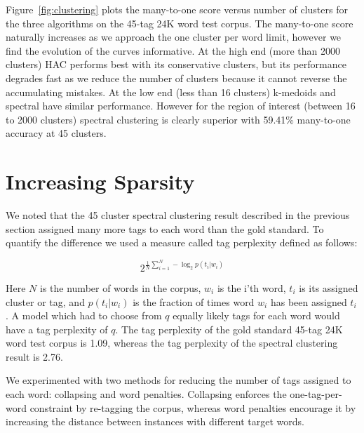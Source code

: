 \documentclass[11pt]{article}
\newcommand{\spectralResult}{59.41}
\begin{document}


Figure~\ref{fig:clustering} plots the many-to-one score versus number
of clusters for the three algorithms on the 45-tag 24K word test
corpus.  The many-to-one score naturally increases as we approach the
one cluster per word limit, however we find the evolution of the
curves informative.  At the high end (more than 2000 clusters) HAC
performs best with its conservative clusters, but its performance
degrades fast as we reduce the number of clusters because it cannot
reverse the accumulating mistakes.  At the low end (less than 16
clusters) k-medoids and spectral have similar performance.  However
for the region of interest (between 16 to 2000 clusters) spectral
clustering is clearly superior with \spectralResult\% many-to-one
accuracy at 45 clusters.

\section{Increasing Sparsity}
\label{sec:sparsity}

We noted that the 45 cluster spectral clustering result described in
the previous section assigned many more tags to each word than the
gold standard.  To quantify the difference we used a measure called
tag perplexity defined as follows:

\[ 2^{\frac{1}{N}\sum_{i=1}^N -\log_2 p(t_i | w_i)} \]

Here $N$ is the number of words in the corpus, $w_i$ is the i'th word,
$t_i$ is its assigned cluster or tag, and $p(t_i|w_i)$ is the fraction
of times word $w_i$ has been assigned $t_i$.  A model which had to
choose from $q$ equally likely tags for each word would have a tag
perplexity of $q$.  The tag perplexity of the gold standard 45-tag 24K
word test corpus is 1.09, whereas the tag perplexity of the spectral
clustering result is 2.76.

We experimented with two methods for reducing the number of tags
assigned to each word: collapsing and word penalties.  Collapsing
enforces the one-tag-per-word constraint by re-tagging the corpus,
whereas word penalties encourage it by increasing the distance between
instances with different target words.
\end{document}
